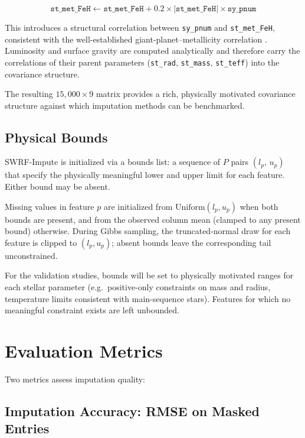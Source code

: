 \documentclass[preprint]{aastex631}
\begin{document}
\begin{equation}
  \texttt{st\_met\_FeH} \leftarrow \texttt{st\_met\_FeH} + 0.2 \times |\texttt{st\_met\_FeH}| \times \texttt{sy\_pnum}
\end{equation}

This introduces a structural correlation between \verb|sy_pnum| and \verb|st_met_FeH|, consistent with the well-established giant-planet--metallicity correlation \citep{johnsonGiantPlanetOccurrence2010,gonzalezStellarMetallicityGiant1997}. Luminosity and surface gravity are computed analytically and therefore carry the correlations of their parent parameters (\texttt{st\_rad}, \texttt{st\_mass}, \texttt{st\_teff}) into the covariance structure.

The resulting $15{,}000 \times 9$ matrix provides a rich, physically motivated covariance structure against which imputation methods can be benchmarked.

\subsection{Physical Bounds}

SWRF-Impute is initialized via a bounds list: a sequence of $P$ pairs $(l_p,\, u_p)$ that specify the physically meaningful lower and upper limit for each feature. Either bound may be absent.

Missing values in feature $p$ are initialized from $\mathrm{Uniform}(l_p, u_p)$ when both bounds are present, and from the observed column mean (clamped to any present bound) otherwise. During Gibbs sampling, the truncated-normal draw for each feature is clipped to $(l_p, u_p)$; absent bounds leave the corresponding tail unconstrained.

For the validation studies, bounds will be set to physically motivated ranges for each stellar parameter (e.g.\ positive-only constraints on mass and radius, temperature limits consistent with main-sequence stars). Features for which no meaningful constraint exists are left unbounded.

\section{Evaluation Metrics}

Two metrics assess imputation quality:

\subsection{Imputation Accuracy: RMSE on Masked Entries}
\end{document}
